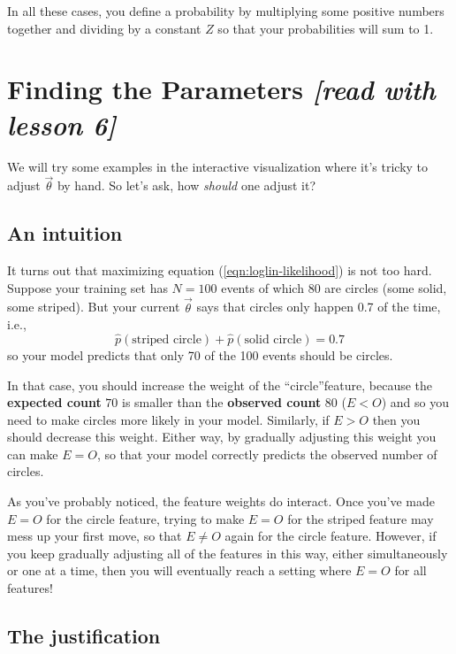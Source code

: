 \documentclass[11pt]{article}
\newcommand{\vtheta}{\vec{\theta}}
\newcommand{\ph}{\hat{p}}
\begin{document}
In all these cases, you define a probability by multiplying some
positive numbers together and dividing by a constant $Z$ so that your
probabilities will sum to 1.

\section{Finding the Parameters {\em [read with lesson 6]}}
  
We will try some examples in the interactive visualization where it's
tricky to adjust $\vtheta$ by hand.  So let's ask, how {\em should}
one adjust it?

\subsection{An intuition}

It turns out that maximizing equation (\ref{eqn:loglin-likelihood}) is
not too hard.  Suppose your training set has $N=100$ events of which
80 are circles (some solid, some striped).  But your current $\vtheta$
says that circles only happen 0.7 of the time, i.e.,
$$\ph(\textrm{striped circle}) + \ph(\textrm{solid circle}) = 0.7$$
so your model predicts that only 70 of the 100 events should be circles.

In that case, you should increase the weight of the ``circle''feature,
because the {\bf expected count} $70$ is smaller than the {\bf
  observed count} $80$ ($E < O$) and so you need to make circles more
likely in your model.  Similarly, if $E > O$ then you should decrease this weight.
Either way, by gradually adjusting this weight you can make $E=O$, so
that your model correctly predicts the observed number of circles.

As you've probably noticed, the feature weights do interact.  Once
you've made $E=O$ for the circle feature, trying to make $E=O$ for the
striped feature may mess up your first move, so that $E \neq O$ again
for the circle feature.  However, if you keep gradually adjusting all
of the features in this way, either simultaneously or one at a time,
then you will eventually reach a setting where $E=O$ for all features!

\subsection{The justification}
\end{document}
